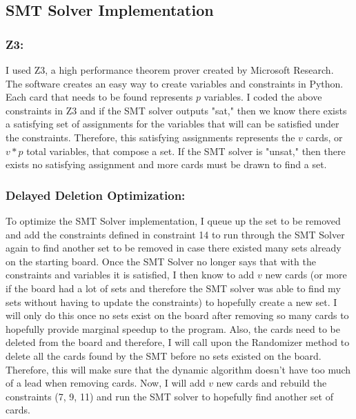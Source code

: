 \documentclass[pageno]{jpaper}
\begin{document}
\subsection{SMT Solver Implementation}


\subsubsection{Z3:}
I used Z3, a high performance theorem prover created by Microsoft Research. The software creates an easy way to create variables and constraints in Python. Each card that needs to be found represents $p$ variables. I coded the above constraints in Z3 and if the SMT solver outputs "sat," then we know there exists a satisfying set of assignments for the variables that will can be satisfied under the constraints. Therefore, this satisfying assignments represents the $v$ cards, or $v*p$ total variables, that compose a set. If the SMT solver is "unsat," then there exists no satisfying assignment and more cards must be drawn to find a set. 


\subsubsection{Delayed Deletion Optimization:}

To optimize the SMT Solver implementation, I queue up the set to be removed and add the constraints defined in constraint 14 to run through the SMT Solver again to find another set to be removed in case there existed many sets already on the starting board. Once the SMT Solver no longer says that with the constraints and variables it is satisfied, I then know to add $v$ new cards (or more if the board had a lot of sets and therefore the SMT solver was able to find my sets without having to update the constraints) to hopefully create a new set. I will only do this once no sets exist on the board after removing so many cards to hopefully provide marginal speedup to the program. Also, the cards need to be deleted from the board and therefore, I will call upon the Randomizer method to delete all the cards found by the SMT before no sets existed on the board. Therefore, this will make sure that the dynamic algorithm doesn't have too much of a lead when removing cards. Now, I will add $v$ new cards and rebuild the constraints (7, 9, 11) and run the SMT solver to hopefully find another set of cards. 
\end{document}
